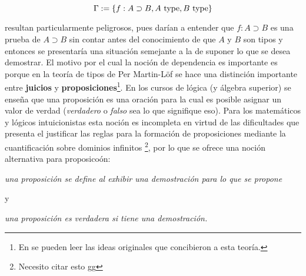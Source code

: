 \documentclass{article}
\begin{document}
        $$
            \Gamma := \{f : A \supset B, A\ \mathrm{type}, B\ \mathrm{type}\}
        $$

        resultan particularmente peligrosos, pues dar\'{i}an a entender que
        $f : A \supset B$ es una prueba de $A \supset B$ sin contar antes del
        conocimiento de que $A$ y $B$ son tipos y entonces se presentar\'{i}a
        una situación semejante a la de suponer lo que se desea demostrar. El
        motivo por el cual la noción de dependencia es importante es porque en
        la teor\'{i}a de tipos de Per Martin-L\"{o}f se hace una distinci\'{o}n
        importante entre \textbf{juicios} y \textbf{proposiciones}\footnote{En 
        \cite{PerMartin-Lof98} se pueden leer las ideas originales que 
        concibieron a esta teoría.}. En los cursos de l\'{o}gica (y \'{a}lgebra 
        superior) se enseña que una proposición es una oraci\'{o}n para la cual 
        es posible asignar un valor de verdad (\textit{verdadero} o 
        \textit{falso} sea lo que signifique eso). Para los matem\'{a}ticos y
        l\'{o}gicos intuicionistas esta noción es incompleta en virtud de las
        dificultades que presenta el justificar las reglas para la formación de
        proposiciones mediante la cuantificaci\'{o}n sobre dominios infinitos \footnote{Necesito citar esto gg},
        por lo que se ofrece una noci\'{o}n alternativa para proposico\'{o}n:
        \begin{center}
            \textit{una proposici\'{o}n se define al exhibir una 
            demostraci\'{o}n para lo que se propone}
        \end{center}
        y
        \begin{center}
            \textit{una proposición es verdadera  si tiene una demostraci\'{o}n.}
        \end{center}
        \cite{PerMartin-Lof98}
\end{document}
